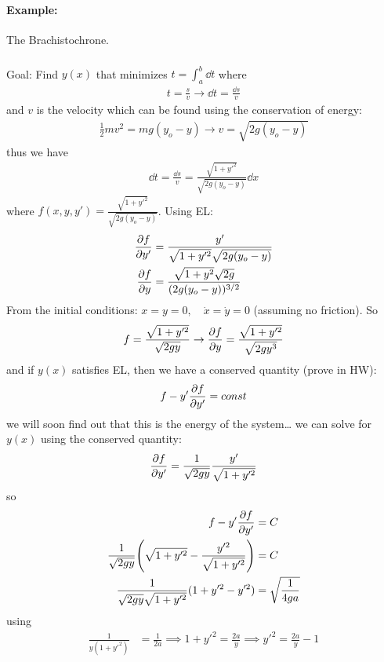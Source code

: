 \documentclass[../main.tex]{subfiles}
\begin{document}
\paragraph*{Example:} The Brachistochrone. 
\subparagraph*{} Goal: Find $y(x)$ that minimizes $t = \int_a^b \dd t$ where 
\begin{align*}
    t = \frac{s}{v} \to \dd t = \frac{\dd s}{v}
\end{align*}
and $v$ is the velocity which can be found using the conservation of energy:
\begin{align*}
    \frac{1}{2} m v^2 = mg(y_o - y) \to v = \sqrt{2g(y_o - y)}
\end{align*}
thus we have
\begin{align*}
    \dd t = \frac{\dd s}{v} = \frac{\sqrt{1 + y'^2}}{\sqrt{2g(y_o - y)}} \dd x
\end{align*}
where $f(x, y, y') = \frac{\sqrt{1 + y'^2}}{\sqrt{2g(y_o - y)}}$. Using EL:
\begin{align*}
    \pdv{f}{y'} &= \frac{y'}{\sqrt{1 + y'^2}\sqrt{2g(y_o - y)}} \\
    \pdv{f}{y} &= \frac{\sqrt{1 + y^2} \sqrt{2g}}{(2g(y_o - y))^{3/2}} 
\end{align*}
From the initial conditions: $x = y = 0, \quad \dot x = \dot y = 0$ (assuming no friction). So
\begin{align*}
    f = \frac{\sqrt{1 + y'^2}}{\sqrt{2gy}} \to \pdv{f}{y} = \frac{\sqrt{1 + y'^2}}{\sqrt{2gy^3}}
\end{align*} 
and if $y(x)$ satisfies EL, then we have a conserved quantity (prove in HW):
\begin{align*}
    f - y' \pdv{f}{y'} = const
\end{align*}
we will soon find out that this is the energy of the system\dots
we can solve for $y(x)$ using the conserved quantity:
\begin{align*}
    \pdv{f}{y'} = \frac{1}{\sqrt{2gy}} \frac{y'}{\sqrt{1 + y'^2}}
\end{align*}
so 
\begin{align*}
    f - y' \pdv{f}{y'} &= C \\
    \frac{1}{\sqrt{2gy}}\qt(\sqrt{1 + y'^2} - \frac{y'^2}{\sqrt{1 + y'^2}}) &= C  \\
    \frac{1}{\sqrt{2gy}\sqrt{1 + y'^2}} (1 + y'^2 - y'^2) &= \sqrt{\frac{1}{4ga}}
\end{align*}
using
\begin{align*}
    \frac{1}{y(1 + y'^2)} &= \frac{1}{2a} \implies 1 + y'^2 = \frac{2a}{y} \implies y'^2 = \frac{2a}{y} - 1
\end{align*}
\end{document}
